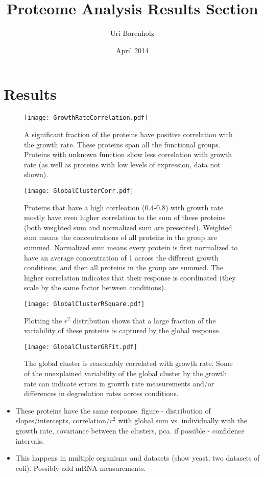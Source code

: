 \documentclass[a4page,notitlepage]{article}
\title{Proteome Analysis Results Section}
\author{Uri Barenholz}
\date{April 2014}
\begin{document}
\maketitle
\section{Results}

\begin{figure}[h]
\centering
\texttt{[image: GrowthRateCorrelation.pdf]}
\caption{
A significant fraction of the proteins have positive correlation with the growth rate.
These proteins span all the functional groups.
Proteins with unknown function show less correlation with growth rate (as well as proteins with low levels of expression, data not shown).
}
\label{growth-corr}
\end{figure}

\begin{figure}[h]
\centering
\texttt{[image: GlobalClusterCorr.pdf]}
\caption{
Proteins that have a high corrleation (0.4-0.8) with growth rate mostly have even higher correlation to the sum of these proteins (both weighted sum and normalized sum are presented).
Weighted sum means the concentrations of all proteins in the group are summed.
Normalized sum means every protein is first normalized to have an average concentration of 1 across the different growth conditions, and then all proteins in the group are summed.
The higher correlation indicates that their response is coordinated (they scale by the same factor between conditions).
}
\label{global-corr}
\end{figure}

\begin{figure}[h]
\centering
\texttt{[image: GlobalClusterRSquare.pdf]}
\caption{
Plotting the $r^2$ distribution shows that a large fraction of the variability of these proteins is captured by the global response.
}
\label{global-rsq}
\end{figure}

\begin{figure}[h]
\centering
\texttt{[image: GlobalClusterGRFit.pdf]}
\caption{
The global cluster is reasonably correlated with growth rate.
Some of the unexplained variability of the global cluster by the growth rate can indicate errors in growth rate measurements and/or differences in degredation rates across conditions.
}
\label{global-grcorr}
\end{figure}

\begin{itemize}
 
\item These proteins have the same response.
figure - distribution of slopes/intercepts, correlation/$r^2$ with global sum vs. individually with the growth rate, covariance between the clusters, pca. if possible - confidence intervals.
\item This happens in multiple organisms and datasets (show yeast, two datasets of coli). Possibly add mRNA measurements.
\end{itemize}
\end{document}
